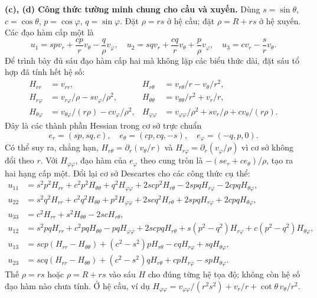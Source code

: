 \documentclass[10pt,a4paper]{article}
\begin{document}
\textbf{(c), (d) Công thức tường minh chung cho cầu và xuyến.} Dùng $s=\sin\theta$, $c=\cos\theta$, $p=\cos\varphi$, $q=\sin\varphi$. Đặt $\rho=r s$ ở hệ cầu; đặt $\rho=R+rs$ ở hệ xuyến. Các đạo hàm cấp một là
\[u_1=spv_r+\frac{cp}{r}v_\theta-\frac q\rho v_\varphi,\quad
u_2=sqv_r+\frac{cq}{r}v_\theta+\frac p\rho v_\varphi,\quad
u_3=cv_r-\frac sr v_\theta.\]
Để trình bày đủ sáu đạo hàm cấp hai mà không lặp các biểu thức dài, đặt sáu tổ hợp đã tính hết hệ số:
\begin{align*}
H_{rr}&=v_{rr},& H_{r\theta}&=v_{r\theta}/r-v_\theta/r^2,\\
H_{r\varphi}&=v_{r\varphi}/\rho-sv_\varphi/\rho^2,&
H_{\theta\theta}&=v_{\theta\theta}/r^2+v_r/r,\\
H_{\theta\varphi}&=v_{\theta\varphi}/(r\rho)-cv_\varphi/\rho^2,&
H_{\varphi\varphi}&=v_{\varphi\varphi}/\rho^2+sv_r/\rho+cv_\theta/(r\rho).
\end{align*}
Đây là các thành phần Hessian trong cơ sở trực chuẩn
\[e_r=(sp,sq,c),\quad e_\theta=(cp,cq,-s),\quad e_\varphi=(-q,p,0).\]
Có thể suy ra, chẳng hạn, $H_{r\theta}=\partial_r(v_\theta/r)$ và $H_{r\varphi}=\partial_r(v_\varphi/\rho)$ vì cơ sở không đổi theo $r$. Với $H_{\varphi\varphi}$, đạo hàm của $e_\varphi$ theo cung tròn là $-(se_r+ce_\theta)/\rho$, tạo ra hai hạng cấp một. Đổi lại cơ sở Descartes cho các công thức cụ thể:
\begin{align*}
u_{11}&=s^2p^2H_{rr}+c^2p^2H_{\theta\theta}+q^2H_{\varphi\varphi}
+2scp^2H_{r\theta}-2spqH_{r\varphi}-2cpqH_{\theta\varphi},\\
u_{22}&=s^2q^2H_{rr}+c^2q^2H_{\theta\theta}+p^2H_{\varphi\varphi}
+2scq^2H_{r\theta}+2spqH_{r\varphi}+2cpqH_{\theta\varphi},\\
u_{33}&=c^2H_{rr}+s^2H_{\theta\theta}-2scH_{r\theta},\\
u_{12}&=s^2pqH_{rr}+c^2pqH_{\theta\theta}-pqH_{\varphi\varphi}
+2scpqH_{r\theta}+s(p^2-q^2)H_{r\varphi}+c(p^2-q^2)H_{\theta\varphi},\\
u_{13}&=scp(H_{rr}-H_{\theta\theta})+(c^2-s^2)pH_{r\theta}-cqH_{r\varphi}+sqH_{\theta\varphi},\\
u_{23}&=scq(H_{rr}-H_{\theta\theta})+(c^2-s^2)qH_{r\theta}+cpH_{r\varphi}-spH_{\theta\varphi}.
\end{align*}
Thế $\rho=rs$ hoặc $\rho=R+rs$ vào sáu $H$ cho đúng từng hệ tọa độ; không còn hệ số đạo hàm nào chưa tính. Ở hệ cầu, ví dụ $H_{\varphi\varphi}=v_{\varphi\varphi}/(r^2s^2)+v_r/r+\cot\theta\,v_\theta/r^2$.
\end{document}
